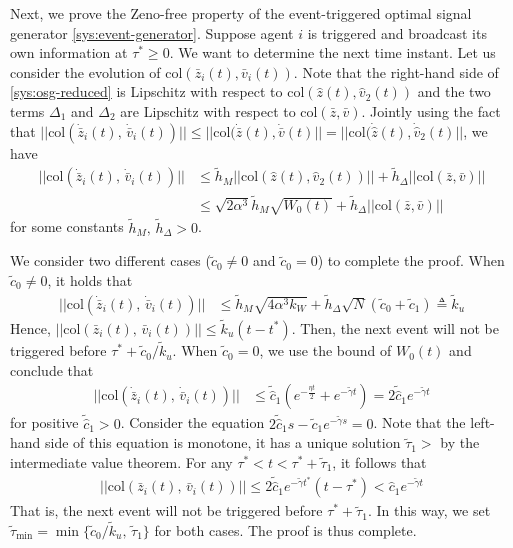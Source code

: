 \documentclass[sort&compress]{IEEEtran}
\begin{document}
Next, we prove the Zeno-free property of the event-triggered optimal signal generator \eqref{sys:event-generator}. Suppose agent $i$ is triggered and broadcast its own information at $\tau^*\geq 0$. We want to determine the next time instant.  Let us consider the evolution of $\mbox{col}(\bar {z}_i(t),\bar{v}_i(t))$. Note that the right-hand side of \eqref{sys:osg-reduced} is  Lipschitz with respect to  $\mbox{col}(\hat {z}(t),\hat{v}_2(t))$ and the two terms $\Delta_1$ and $\Delta_2$ are Lipschitz with respect to $\mbox{col}(\bar {z},\bar{v})$. Jointly using the fact that $ ||\mbox{col}(\dot{\bar {z}}_i(t),\,\dot{\bar{v}}_i(t))||\leq ||\mbox{col}(\dot{\bar {z}}(t),\dot{\bar{v}}(t)||=||\mbox{col}(\dot{\hat z}(t),\dot{\hat{v}}_2(t)||$, we have
\begin{align*}
	||\mbox{col}(\dot{\bar {z}}_i(t),\,\dot{\bar{v}}_i(t))||&\leq \tilde h_M ||\mbox{col}(\hat {z}(t),\hat{v}_2(t))||+\tilde h_\Delta ||\mbox{col}(\bar {z},\bar{v})||\\
	&\leq  \sqrt{2\alpha^3} \tilde h_M \sqrt{W_0(t)}+\tilde h_\Delta ||\mbox{col}(\bar {z},\bar{v})||
\end{align*}
for some constants $\tilde h_M,\, \tilde h_\Delta>0$. 

We consider two different cases ($\tilde c_0\neq 0$ and $\tilde c_0=0$) to complete the proof. When $\tilde c_0\neq 0$, it holds that 
\begin{align*}
	||\mbox{col}(\dot{\bar {z}}_i(t),\,\dot{\bar{v}}_i(t))||&\leq \tilde h_M \sqrt{4\alpha^3 k_W} +\tilde h_\Delta \sqrt{N} (\tilde c_0+\tilde c_1)\triangleq \tilde k_u
\end{align*}
Hence, $||\mbox{col}({\bar {z}}_i(t),\,\bar{v}_i(t))||\leq \tilde  k_u (t-t^*)$. Then, the next event will not be triggered before $\tau^*+\tilde c_0/\tilde k_u$.  When $\tilde c_0=0$, we use the bound of $W_0(t)$ and conclude that
\begin{align*}
	||\mbox{col}(\dot{\bar {z}}_i(t),\,\dot{\bar{v}}_i(t))||&\leq \tilde{\hat c}_1(e^{-\frac{\eta t}{2}}+e^{-\tilde \gamma t }) =2\tilde{\hat c}_1 e^{-\tilde \gamma t }
\end{align*}
for positive $\tilde{\hat c}_1>0$. Consider the equation $2\tilde{\hat c}_1 s-\tilde c_1 e^{-\tilde \gamma s}=0$. Note that the left-hand side of this equation is monotone, it has a unique solution $\tilde \tau_1>$ by the intermediate value theorem.  For any $\tau^*<t<\tau^*+\tilde \tau_1$, it follows that
\begin{align*}
	||\mbox{col}({\bar {z}}_i(t),\,{\bar{v}}_i(t))||\leq 2\tilde{\hat c}_1 e^{-\tilde \gamma t^* }(t-\tau^*)<{\hat c}_1 e^{-\tilde \gamma t }
\end{align*}
That is, the next event will not be triggered before $\tau^*+\tilde \tau_1$.  In this way, we set $\tilde \tau_{\min}=\min\{\tilde c_0/\tilde k_u,\,\tilde \tau_1\}$ for both cases. The proof is thus complete.

	



\end{document}
